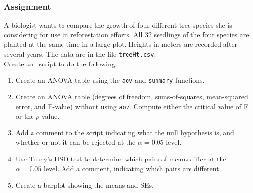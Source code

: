 \documentclass[color=usenames,dvipsnames]{beamer}\usepackage[]{graphicx}\usepackage[]{color}
\newcommand{\inr}[1]{\colorbox{inlinecolor}{\texttt{#1}}}
\begin{document}




\begin{frame}
  \frametitle{Assignment}
  \small
  A biologist wants to compare the growth of four different tree
  species she is considering for use in reforestation efforts.  All 32
  seedlings of the four species are planted at the same time in a
  large plot. Heights in meters are recorded after several years. The data
  are in the file {\tt treeHt.csv}: \\
  \vfill
  Create an \R~script to do the following:
  \begin{enumerate}[\bf (1)]
  \item Create an ANOVA table using the \inr{aov} and \inr{summary}
    functions.
  \item Create an ANOVA table (degrees of freedom,
    sums-of-squares, mean-squared error, and F-value) without using
    \inr{aov}. Compute either the critical value of F or
    the $p$-value.
  \item Add a comment to the script indicating what the null
    hypothesis is, and whether or not it can be rejected at the
    $\alpha = 0.05$ level.
  \item Use Tukey's HSD test to determine which pairs of means differ
    at the $\alpha = 0.05$ level.  Add a comment, indicating which
    pairs are different.
  \item Create a barplot showing the means and SEs.
  \end{enumerate}

\end{frame}
\end{document}
